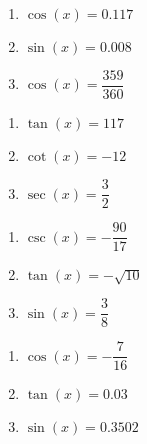 \begin{multicols}{3}

\begin{enumerate}

\setcounter{enumi}{\value{HW}}

\item $\cos(x) = 0.117$ 
\item $\sin(x) = 0.008$ 
\item $\cos(x) = \dfrac{359}{360}$

\setcounter{HW}{\value{enumi}}

\end{enumerate}

\end{multicols}

\begin{multicols}{3}

\begin{enumerate}

\setcounter{enumi}{\value{HW}}

\item $\tan(x) = 117$ 
\item $\cot(x) = -12$ 
\item $\sec(x) = \dfrac{3}{2}$

\setcounter{HW}{\value{enumi}}

\end{enumerate}

\end{multicols}

\begin{multicols}{3}

\begin{enumerate}

\setcounter{enumi}{\value{HW}}

\item $\csc(x) = -\dfrac{90}{17}$
\item $\tan(x) = -\sqrt{10}$ 
\item $\sin(x) = \dfrac{3}{8}$

\setcounter{HW}{\value{enumi}}

\end{enumerate}

\end{multicols}

\begin{multicols}{3}

\begin{enumerate}

\setcounter{enumi}{\value{HW}}

\item $\cos(x) = -\dfrac{7}{16}$
\item $\tan(x) = 0.03$ 
\item $\sin(x) = 0.3502$ 

\setcounter{HW}{\value{enumi}}

\end{enumerate}

\end{multicols}

